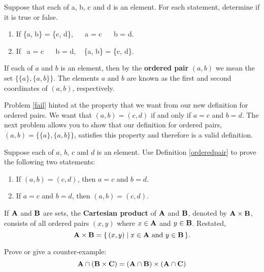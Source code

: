 \begin{prb}
\label{fail}
Suppose that each of a, b, c and d is an element. For each statement, determine if it is true or false.
\begin{enumerate}
\item If \{a, b\} = \{c, d\}, \  \ a = c \  \ b = d.
\item If \ a = c \  \ b = d, \  \{a, b\} = \{c, d\}.
\end{enumerate}
\end{prb}

\begin{dfn}
\label{orderedpair}
If each of $a$ and $b$ is an element, then by the \textbf{ordered pair} $(a, b)$ we mean the set $\{\{a\}, \{a, b\}\}$.  The elements $a$ and $b$ are known as the first and second coordinates of $(a,b)$, respectively.
\end{dfn}

Problem \ref{fail} hinted at the property that we want from our new definition for ordered pairs. We want that $(a, b) = (c, d)$ if and only if $a = c$ and $b = d.$ The next problem allows you to show that our definition for ordered pairs, $(a, b) = \{ \{a\}, \{a, b\}\}$, satisfies this property and therefore is a valid definition.

\begin{prb}
\label{OrdPair}
Suppose each of $a$, $b$, $c$ and $d$ is an element.  Use Definition \ref{orderedpair} to prove the following two statements:
\begin{enumerate}
\item If $(a, b) = (c, d)$, then $a = c$ and $b = d$.
\item If $a = c$ and $b = d$, then $(a, b) = (c, d)$.
\end{enumerate}
\end{prb}

\begin{dfn}
\label{cartesian}
If $\mathbf A$ and $\mathbf B$ are sets, the \textbf{Cartesian product} of $\mathbf A$ and $\mathbf B$, denoted by $\mathbf A\times \mathbf B$, consists of all ordered pairs $(x,y)$ where $x\in \mathbf A$ and $y\in \mathbf B$.  Restated, $$\mathbf A\times \mathbf B = \{\,(x,y) \mid x\in \mathbf A \mbox{ and } y\in \mathbf B\,\}.$$
\end{dfn}

\begin{prb}
Prove or give a counter-example:  $$\mathbf A\cap (\mathbf B\times \mathbf C) = (\mathbf A\cap \mathbf B) \times (\mathbf A\cap \mathbf C)$$
\end{prb}



